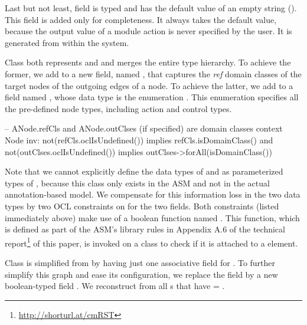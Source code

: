 \begin{description}
Last but not least, field  is typed  and has the default value of an empty string (\strq{}). This field is added only for completeness. It always takes the default value, because the output value of a module action is never specified by the user. It is generated from within the system.
%
\item[\clazz{ANode}.] Class  both represents  and  and merges the entire  type hierarchy. To achieve the former, we add to  a new field, named , that captures the \textit{ref} domain classes of the target nodes of the outgoing edges of a node. To achieve the latter, we add to  a field named , whose data type is the enumeration . This enumeration specifies all the pre-defined node types, including action and control types.

\begin{lstrule}
-- ANode.refCls and ANode.outClses (if specified) are domain classes
context Node inv:
  not(refCls.oclIsUndefined()) implies refCls.isDomainClass() and 
  not(outClses.oclIsUndefined()) implies outClses->forAll(isDomainClass())
\end{lstrule}

Note that we cannot explicitly define the data types of  and  as parameterized types of , because this class only exists in the ASM and not in the actual annotation-based model. We compensate for this information loss in the two data types by two OCL constraints on  for the two fields. Both constraints (listed immediately above) make use of a boolean function named . This function, which is defined as part of the ASM's library rules in Appendix A.6 of the technical report\footnote{\url{http://shorturl.at/cmRST}} of this paper, %
is invoked on a class to check if it is attached to a  element. 
%
\item[\clazz{AGraph}.] Class  is simplified from  by having just one associative field for . To further simplify this graph and ease its configuration, we replace the field  by a new boolean-typed field . We reconstruct  from all s that have  = .
\end{description}


